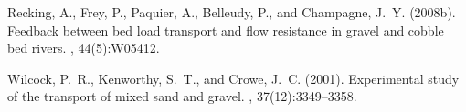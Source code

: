 \documentclass[11pt]{article}
\begin{document}
\begin{thebibliography}{3}
Recking, A., Frey, P., Paquier, A., Belleudy, P., and Champagne, J.~Y. (2008b).
\newblock Feedback between bed load transport and flow resistance in gravel and
  cobble bed rivers.
, 44(5):W05412.

%
%

%
%
%


Wilcock, P.~R., Kenworthy, S.~T., and Crowe, J.~C. (2001).
\newblock Experimental study of the transport of mixed sand and gravel.
, 37(12):3349--3358.


\end{thebibliography}
\end{document}

